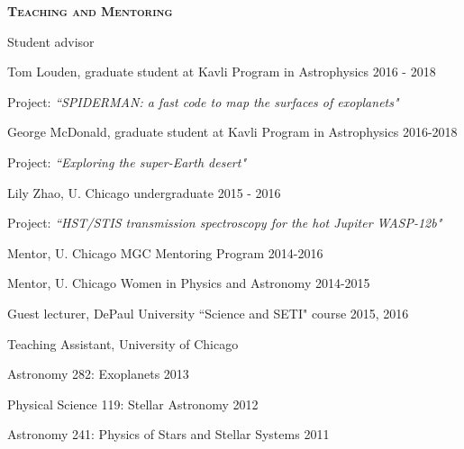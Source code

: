 \documentclass[12pt,letterpaper]{article}
\begin{document}
\vspace{7mm}
\textbf{\textsc{Teaching and Mentoring}} 
\begin{compactitem}[]
\item Student advisor
	\begin{compactitem}
	\item Tom Louden, graduate student at Kavli Program in Astrophysics \hfill 2016 - 2018
		\begin{sloppypar}
		Project: \textit{``SPIDERMAN: a fast code to map the surfaces of exoplanets"}
		\end{sloppypar}
	\item George McDonald, graduate student at Kavli Program in Astrophysics \hfill 2016-2018
		\begin{sloppypar}
		Project: \textit{``Exploring the super-Earth desert"}
		\end{sloppypar}
	\item Lily Zhao, U. Chicago undergraduate \hfill 2015 - 2016
		\begin{sloppypar}
		Project: \textit{``HST/STIS transmission spectroscopy for the hot Jupiter WASP-12b"}
		\end{sloppypar}
	\end{compactitem}
\item Mentor, U. Chicago MGC Mentoring Program \hfill 2014-2016 
\item Mentor, U. Chicago Women in Physics and Astronomy \hfill2014-2015
\item Guest lecturer, DePaul University ``Science and SETI" course \hfill2015, 2016
\item Teaching Assistant, University of Chicago
	\begin{compactitem}
	\item Astronomy 282:  Exoplanets \hfill 2013
	\item Physical Science 119:  Stellar Astronomy	\hfill 2012
	\item Astronomy 241:  Physics of Stars and Stellar Systems \hfill	2011 
	\end{compactitem}
\end{compactitem}
\end{document}
